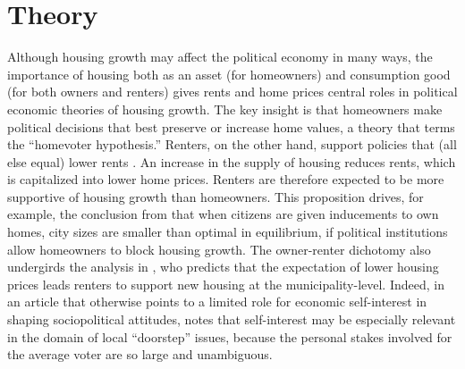\documentclass[article,12pt]{memoir}
\begin{document}
\section{Theory}\label{sec:hg_theory}

Although housing growth may affect the political economy in many ways, the importance of housing both as an asset (for homeowners) and consumption good (for both owners and renters) gives rents and home prices central roles in political economic theories of housing growth. The key insight is that homeowners make political decisions that best preserve or increase home values, a theory that \citet{fischel_homevoter_2001} terms the ``homevoter hypothesis.'' Renters, on the other hand, support policies that (all else equal) lower rents \citep{hilber_origins_2013,ortalo-magne_political_2014}. An increase in the supply of housing reduces rents, which is capitalized into lower home prices. Renters are therefore expected to be more supportive of housing growth than homeowners. This proposition drives, for example, the conclusion from \citet{ortalo-magne_political_2014} that when citizens are given inducements to own homes, city sizes are smaller than optimal in equilibrium, if political institutions allow homeowners to block housing growth. The owner-renter dichotomy also undergirds the analysis in \citet{hankinson_when_2018}, who predicts that the expectation of lower housing prices leads renters to support new housing at the municipality-level. Indeed, in an article that otherwise points to a limited role for economic self-interest in shaping sociopolitical attitudes, \citet[][p. 79]{sears_role_1991} notes that self-interest may be especially relevant in the domain of local ``doorstep'' issues, because the personal stakes involved for the average voter are so large and unambiguous.
\end{document}
